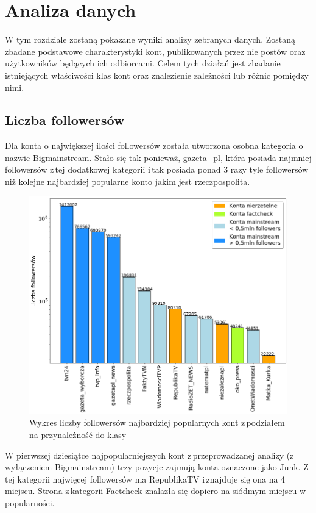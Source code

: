 \section{Analiza danych}
W tym rozdziale zostaną pokazane wyniki analizy zebranych danych. Zostaną zbadane podstawowe charakterystyki kont, publikowanych przez nie postów oraz użytkowników będących ich odbiorcami.  Celem tych działań jest zbadanie istniejących właściwości klas kont oraz znalezienie zależności lub różnic pomiędzy nimi.  
\subsection{Liczba followersów }Dla konta o największej ilości followersów została utworzona osobna kategoria o nazwie Bigmainstream. Stało się tak ponieważ, gazeta\_pl, która posiada najmniej followersów z\,tej dodatkowej kategorii i\,tak posiada ponad 3 razy tyle followersów niż kolejne najbardziej popularne konto jakim jest rzeczpospolita.
\begin{figure}[!h]
	\label{fig:followers}
	\centering \includegraphics[width=0.9\linewidth]{img/results/followers.png}
	\caption{Wykres liczby followersów najbardziej popularnych kont z\,podziałem na przynależność do klasy}
\end{figure}
\par
W pierwszej dziesiątce najpopularniejszych kont z\,przeprowadzanej analizy (z wyłączeniem Bigmainstream) trzy pozycje zajmują konta oznaczone jako Junk. Z\,tej kategorii najwięcej followersów ma RepublikaTV i\,znajduje się ona na 4 miejscu. Strona z\,kategorii Factcheck znalazła się dopiero na siódmym miejscu w\,popularności.

